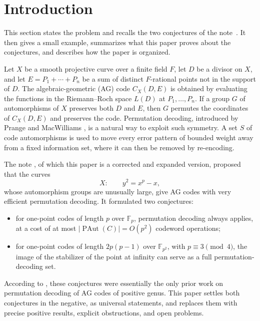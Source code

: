 \documentclass[12pt,letterpaper]{article}
\theoremstyle{definition}
\theoremstyle{remark}
\numberwithin{equation}{section}
\newcommand{\F}{\mathbb{F}}
\newcommand{\PAut}{\operatorname{PAut}}
\begin{document}
\tableofcontents

\section{Introduction}\label{sec:intro}

This section states the problem and recalls the two conjectures of the
note~\cite{Jo05}. It then gives a small example, summarizes what this
paper proves about the conjectures, and describes how the paper is
organized.

Let $X$ be a smooth projective curve over a finite field $F$, let $D$ be
a divisor on $X$, and let $E=P_1+\cdots+P_n$ be a sum of distinct
$F$-rational points not in the support of $D$.  The algebraic-geometric
(AG) code $C_X(D,E)$ is obtained by evaluating the functions in the
Riemann--Roch space $L(D)$ at $P_1,\dots,P_n$.  If a group $G$ of
automorphisms of $X$ preserves both $D$ and $E$, then $G$ permutes the
coordinates of $C_X(D,E)$ and preserves the code.  Permutation decoding,
introduced by Prange and MacWilliams \cite{Pr62,Mac64}, is a natural way
to exploit such symmetry.  A set $S$ of code automorphisms is used to move
every error pattern of bounded weight away from a fixed information set,
where it can then be removed by re-encoding.

The note \cite{Jo05}, of which this paper is a corrected and expanded
version, proposed that the curves
\begin{equation}\label{eq:curve}
X:\qquad y^2=x^p-x,
\end{equation}
whose automorphism groups are unusually large, give AG codes with very
efficient permutation decoding.  It formulated two conjectures:
\begin{itemize}
\item[(C1)] for one-point codes of length $p$ over $\F_p$, permutation
decoding always applies, at a cost of at most $|\PAut(C)|=O(p^2)$ codeword
operations;
\item[(C2)] for one-point codes of length $2p(p-1)$ over $\F_{p^2}$, with
$p\equiv 3\pmod 4$, the image of the stabilizer of the point at infinity
can serve as a full permutation-decoding set.
\end{itemize}
According to \cite{LLMS26}, these conjectures were essentially the only
prior work on permutation decoding of AG codes of positive genus.  This
paper settles both conjectures in the negative, as universal statements,
and replaces them with precise positive results, explicit obstructions,
and open problems.
\end{document}
